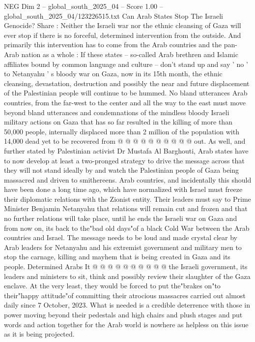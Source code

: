 \begin{textsample}{NEG Dim 2 – global\_south\_2025\_04 – Score 1.00 – global\_south\_2025\_04/123226515.txt}  \label{ex:f2_neg_101}
Can Arab States Stop The Israeli Genocide?
Share : Neither the Israeli war nor the ethnic cleansing of Gaza will ever stop if there is no forceful, determined intervention from the outside.
And primarily this intervention has to come from the Arab countries and the pan-Arab nation as a whole : If these states -- so-called Arab brethren and Islamic affiliates bound by common language and culture -- don't stand up and say ' no ' to Netanyahu ' s bloody war on Gaza, now in its 15th month, the ethnic cleansing, devastation, destruction and possibly the near and future displacement of the Palestinian people will continue to be hummed.
No bland utterances Arab countries, from the far-west to the center and all the way to the east must move beyond bland utterances and condemnations of the mindless bloody Israeli military actions on Gaza that has so far resulted in the killing of more than 50,000 people, internally displaced more than 2 million of the population with 14,000 dead yet to be recovered from @ @ @ @ @ @ @ @ @ @ out.
As well, and further stated by Palestinian activist Dr Mustafa Al Barghouti, Arab states have to now develop at least a two-pronged strategy to drive the message across that they will not stand ideally by and watch the Palestinian people of Gaza being massacred and driven to smithereens.
Arab countries, and incidentally this should have been done a long time ago, which have normalized with Israel must freeze their diplomatic relations with the Zionist entity.
Their leaders must say to Prime Minister Benjamin Netanyahu that relations will remain cut and frozen and that no further relations will take place, until he ends the Israeli war on Gaza and from now on, its back to the"bad old days"of a black Cold War between the Arab countries and Israel.
The message needs to be loud and made crystal clear by Arab leaders for Netanyahu and his extremist government and military men to stop the carnage, killing and mayhem that is being created in Gaza and its people.
Determined Arabs It @ @ @ @ @ @ @ @ @ @ the Israeli government, its leaders and ministers to sit, think and possibly review their slaughter of the Gaza enclave.
At the very least, they would be forced to put the"brakes on"to their"happy attitude"of committing their atrocious massacres carried out almost daily since 7 October, 2023.
What is needed is a credible deterrence with those in power moving beyond their pedestals and high chairs and plush stages and put words and action together for the Arab world is nowhere as helpless on this issue as it is being projected.

\end{textsample}
